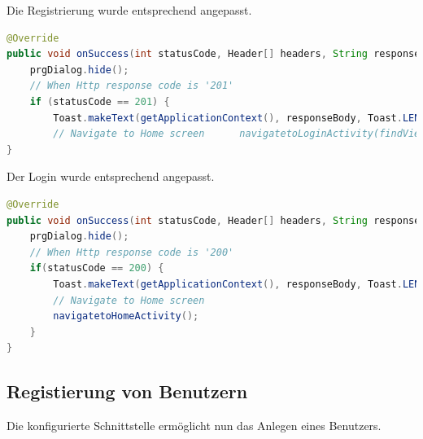 Die Registrierung wurde entsprechend angepasst.
\begin{lstlisting}[frame=single, language=java, caption=Neue Registrierung]
@Override
public void onSuccess(int statusCode, Header[] headers, String responseBody) {
	prgDialog.hide();
	// When Http response code is '201'
	if (statusCode == 201) {
		Toast.makeText(getApplicationContext(), responseBody, Toast.LENGTH_LONG).show();
		// Navigate to Home screen 		navigatetoLoginActivity(findViewById(android.R.id.content)); 	}
}
\end{lstlisting}

Der Login wurde entsprechend angepasst.
\begin{lstlisting}[frame=single, language=java, caption=Neue Registrierung]
@Override
public void onSuccess(int statusCode, Header[] headers, String responseBody) {
	prgDialog.hide();
	// When Http response code is '200'
	if(statusCode == 200) {
		Toast.makeText(getApplicationContext(), responseBody, Toast.LENGTH_LONG).show();
		// Navigate to Home screen
		navigatetoHomeActivity();
	}
}
\end{lstlisting}

\subsection{Registierung von Benutzern}
\label{subsec:Registierung von Benutzern}
Die konfigurierte Schnittstelle ermöglicht nun das Anlegen eines Benutzers.

